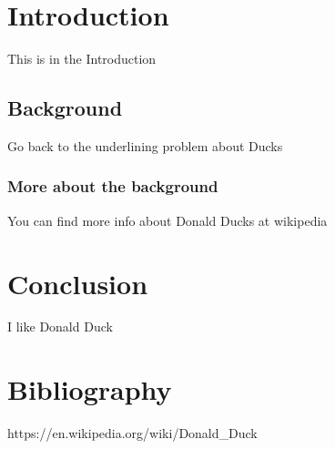 \documentclass[titlepage, english]{thesis}
\begin{document}
\begin{titlepage}
\maketitle
\end{titlepage}

\begin{abstract}{english}
This is the abstract. Blah blah blah...
\end{abstract}

\begin{abstract}{swedish}
Ett sammandrag på svenska bokstaven där bokstäverna  å , ä och ö är inkluderade.
Check that the encoding is correct so that åäö are visible.
\end{abstract}

\begin{abstract}{finnish}
Samma på finska
\end{abstract}


\tableofcontents


\section{Introduction}
This is in the Introduction
\subsection{Background}
Go back to the underlining problem about Ducks
\subsubsection{More about the background}
You can find more info about Donald Ducks at wikipedia  \cite{kalle} 

\newpage

\section {Conclusion}
I like Donald Duck



\section{Bibliography}

\begin{thebibliography}{99}

 https://en.wikipedia.org/wiki/Donald\_Duck

\end{thebibliography}
\end{document}

